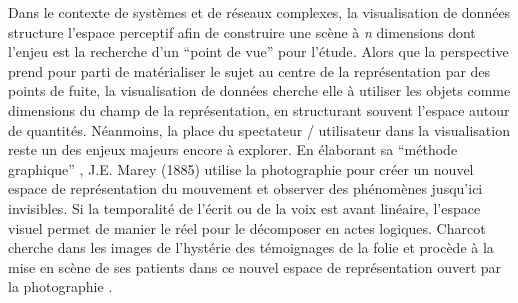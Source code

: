 Dans le contexte de syst\`emes et de r\'eseaux complexes, la
visualisation de donn\'ees structure l{\textquoteright}espace perceptif
afin de construire une sc\`ene \`a \textit{n }dimensions dont
l{\textquoteright}enjeu est la recherche d{\textquoteright}un
{\textquotedblleft}point de vue{\textquotedblright} pour
l{\textquoteright}\'etude\textit{. }Alors que la perspective prend pour
parti de mat\'erialiser le sujet au centre de la repr\'esentation par
des points de fuite, la visualisation de donn\'ees cherche elle \`a
utiliser les objets comme dimensions du champ de la repr\'esentation,
en structurant souvent l{\textquoteright}espace autour de quantit\'es.
N\'eanmoins, la place du spectateur / utilisateur dans la visualisation
reste un des enjeux majeurs encore \`a explorer. En \'elaborant sa
{\textquotedblleft}m\'ethode graphique{\textquotedblright} , J.E. Marey
(1885) utilise la photographie pour cr\'eer un nouvel espace de
repr\'esentation du mouvement et observer des ph\'enom\`enes
jusqu{\textquoteright}ici invisibles. Si la temporalit\'e de
l{\textquoteright}\'ecrit ou de la voix est avant lin\'eaire,
l{\textquoteright}espace visuel permet de manier le r\'eel pour le
d\'ecomposer en actes logiques. Charcot cherche dans les images de
l{\textquoteright}hyst\'erie des t\'emoignages de la folie et proc\`ede
\`a la mise en sc\`ene de ses patients dans ce nouvel espace de
repr\'esentation ouvert par la photographie \cite{Didi-Huberman2012}.

